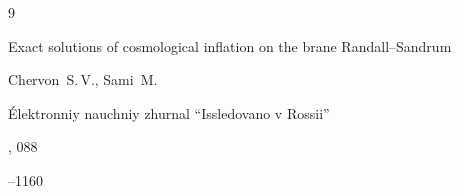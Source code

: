 \begin{thebibliography}{9}

\misctransl 

\paper Exact solutions of cosmological inflation on the brane Randall--Sandrum 

\by Chervon~S.\,V., Sami~M.

\jour \'Elektronniy nauchniy zhurnal ``Issledovano v Rossii''

%


, 088

--1160 





\end{thebibliography}








\makeengtitlem



\newpage

%

% 